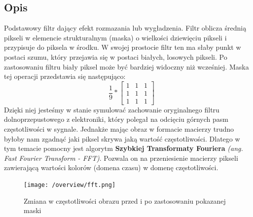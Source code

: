 \documentclass[a4paper,12pt]{book}
\begin{document}
		\subsection{Opis}
			Podstawowy filtr dający efekt rozmazania lub wygładzenia. Filtr oblicza średnią pikseli w elemencie strukturalnym (maska) o wielkości dziewięciu pikseli i przypisuje do piksela w środku. W swojej prostocie filtr ten ma słaby punkt w postaci szumu, który przejawia się w postaci białych, losowych pikseli. Po zastosowaniu filtru biały piksel może być bardziej widoczny niż wcześniej. \newline
			Maska tej operacji przedstawia się następująco:
			\begin{equation*}
				\quad
				\frac{1}{9}
				*
				\begin{bmatrix}
				1 & 1 & 1 \\
				1 & 1 & 1 \\
				1 & 1 & 1
				\end{bmatrix}
			\end{equation*}
			Dzięki niej jesteśmy w stanie symulować zachowanie oryginalnego filtru dolnoprzepustowego z elektroniki, który polegał na odcięciu górnych pasm częstotliwości w sygnale. Jednakże mając obraz w formacie macierzy trudno byłoby nam zgadnąć jaki piksel skrywa jaką wartość częstotliwości. Dlatego w tym temacie pomocny jest algorytm \textbf{Szybkiej Transformaty Fouriera} \textit{(ang. Fast Fourier Transform - FFT)}. Pozwala on na przeniesienie macierzy pikseli zawierającą wartości kolorów (domena czasu) w domenę częstotliwości. 
			\begin{figure}[H]
				\caption{Zmiana w częstotliwości obrazu przed i po zastosowaniu pokazanej maski}
				\texttt{[image: /overview/fft.png]}
			\end{figure}
\end{document}
